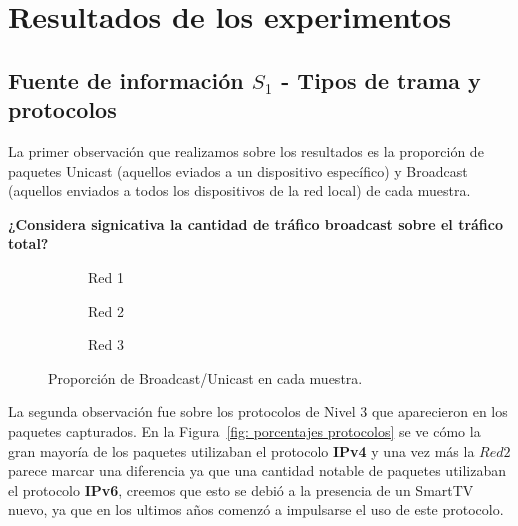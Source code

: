 \section{Resultados de los experimentos}

\subsection{Fuente de información $S_{1}$ - Tipos de trama y protocolos }

La primer observación que realizamos sobre los resultados es la proporción de paquetes Unicast (aquellos eviados a un dispositivo específico) y Broadcast (aquellos enviados a todos los dispositivos de la red local) de cada muestra.

\vspace{4mm}

\textbf{¿Considera signicativa la cantidad de tráfico broadcast sobre el tráfico total?}

\begin{figure}[H]
    \centering
    \begin{subfigure}[b]{0.3\textwidth}
        \centering
        
        \caption{Red 1}
        \label{fig: b/u red 1}
    \end{subfigure}
    \begin{subfigure}[b]{0.3\textwidth} 
        \centering
        
        \caption{Red 2}
        \label{fig: b/u red 2}
    \end{subfigure}
    \begin{subfigure}[b]{0.3\textwidth} 
        \centering
        
        \caption{Red 3}
        \label{fig: b/u red 3}
    \end{subfigure}
    \caption{Proporción de Broadcast/Unicast en cada muestra.}
    \label{fig: broadcast/unicast }
\end{figure}

La segunda observación fue sobre los protocolos de Nivel 3 que aparecieron en los paquetes capturados. En la Figura~\ref{fig: porcentajes protocolos} se ve cómo la gran mayoría de los paquetes utilizaban el protocolo \textbf{IPv4} y una vez más la $Red 2$ parece marcar una diferencia ya que una cantidad notable de paquetes utilizaban el protocolo \textbf{IPv6}, creemos que esto se debió a la presencia de un SmartTV nuevo, ya que en los ultimos años comenzó a impulsarse el uso de este protocolo.

